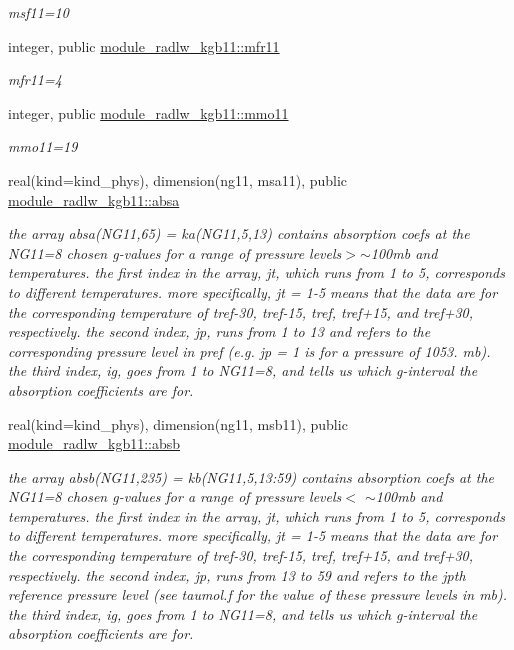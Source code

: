 \begin{Indent}
\begin{DoxyCompactItemize}
\begin{DoxyCompactList}\small\item\em msf11=10 \end{DoxyCompactList}\item 
integer, public \hyperlink{group__module__radlw__kgbnn_ga9b5764441999cce52bc02e65a24420b9}{module\+\_\+radlw\+\_\+kgb11\+::mfr11}
\begin{DoxyCompactList}\small\item\em mfr11=4 \end{DoxyCompactList}\item 
integer, public \hyperlink{group__module__radlw__kgbnn_ga6aabd24aa785ef8689c63b01aaaab243}{module\+\_\+radlw\+\_\+kgb11\+::mmo11}
\begin{DoxyCompactList}\small\item\em mmo11=19 \end{DoxyCompactList}\item 
real(kind=kind\+\_\+phys), dimension(ng11, msa11), public \hyperlink{group__module__radlw__kgbnn_ga7ac883387aa86a635c9aea011c55a1d5}{module\+\_\+radlw\+\_\+kgb11\+::absa}
\begin{DoxyCompactList}\small\item\em the array absa(\+N\+G11,65) = ka(\+N\+G11,5,13) contains absorption coefs at the N\+G11=8 chosen g-\/values for a range of pressure levels$>$$\sim$100mb and temperatures. the first index in the array, jt, which runs from 1 to 5, corresponds to different temperatures. more specifically, jt = 1-\/5 means that the data are for the corresponding temperature of tref-\/30, tref-\/15, tref, tref+15, and tref+30, respectively. the second index, jp, runs from 1 to 13 and refers to the corresponding pressure level in pref (e.\+g. jp = 1 is for a pressure of 1053. mb). the third index, ig, goes from 1 to N\+G11=8, and tells us which g-\/interval the absorption coefficients are for. \end{DoxyCompactList}\item 
real(kind=kind\+\_\+phys), dimension(ng11, msb11), public \hyperlink{group__module__radlw__kgbnn_gacf37465675961812e07616e42b137d70}{module\+\_\+radlw\+\_\+kgb11\+::absb}
\begin{DoxyCompactList}\small\item\em the array absb(\+N\+G11,235) = kb(\+N\+G11,5,13\+:59) contains absorption coefs at the N\+G11=8 chosen g-\/values for a range of pressure levels$<$ $\sim$100mb and temperatures. the first index in the array, jt, which runs from 1 to 5, corresponds to different temperatures. more specifically, jt = 1-\/5 means that the data are for the corresponding temperature of tref-\/30, tref-\/15, tref, tref+15, and tref+30, respectively. the second index, jp, runs from 13 to 59 and refers to the jpth reference pressure level (see taumol.\+f for the value of these pressure levels in mb). the third index, ig, goes from 1 to N\+G11=8, and tells us which g-\/interval the absorption coefficients are for. \end{DoxyCompactList}\item 

\end{DoxyCompactItemize}
\end{Indent}
